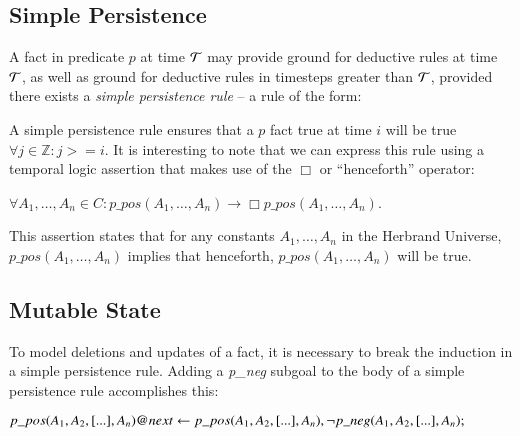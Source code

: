 \subsection{Simple Persistence}

A fact in predicate $p$ at time $\Tau$ may provide ground for deductive rules
at time $\Tau$, as well as ground for deductive rules in timesteps greater than $\Tau$,
provided there exists a {\em simple persistence rule} -- a rule of the form:



A simple persistence rule ensures that a $p$ fact true at time $i$ will be true
$\forall j \in \mathbb{Z} : j >= i$.  It is interesting to note that we can
express this rule using a temporal logic assertion that makes use of the $\Box$
or ``henceforth'' operator:

$\forall A_1, \ldots, A_n \in C : p\_pos(A_1, \ldots, A_n) \to \Box p\_pos(A_1,
\ldots, A_n)$.

This assertion states that for any constants $A_1, \ldots, A_n$ in the Herbrand
Universe, $p\_pos(A_1, \ldots, A_n)$ implies that henceforth, \linebreak
$p\_pos(A_1, \ldots, A_n)$ will be true.

\subsection{Mutable State}

To model deletions and updates of a fact, it is necessary to break the induction
in a simple persistence rule.  Adding a {\em p\_neg} subgoal to the body of a
simple persistence rule accomplishes this:

$p\_pos(A_1,A_2,[...],A_n)@next \leftarrow \\
p\_pos(A_1,A_2,[...],A_n), \\
\lnot p\_neg(A_1,A_2,[...],A_n);
$

